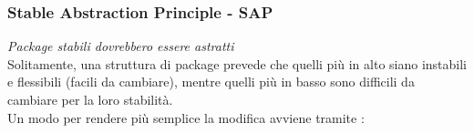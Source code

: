 {    \subsubsection{Stable Abstraction Principle - SAP}
    \textit{Package stabili dovrebbero essere astratti}
    \\
    Solitamente, una struttura di package prevede che quelli più in alto siano instabili e flessibili (facili da cambiare),
    mentre quelli più in basso sono difficili da cambiare per la loro stabilità.
    \\
    Un modo per rendere più semplice la modifica avviene tramite :
    \vspace{0.1cm}
    \begin{center}
    \end{center}

}

